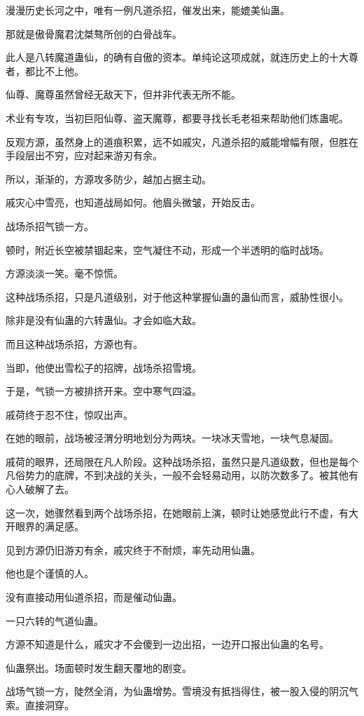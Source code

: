 \begin{this_body}
漫漫历史长河之中，唯有一例凡道杀招，催发出来，能媲美仙蛊。

那就是傲骨魔君沈桀骜所创的白骨战车。

此人是八转魔道蛊仙，的确有自傲的资本。单纯论这项成就，就连历史上的十大尊者，都比不上他。

仙尊、魔尊虽然曾经无敌天下，但并非代表无所不能。

术业有专攻，当初巨阳仙尊、盗天魔尊，都要寻找长毛老祖来帮助他们炼蛊呢。

反观方源，虽然身上的道痕积累，远不如戚灾，凡道杀招的威能增幅有限，但胜在手段层出不穷，应对起来游刃有余。

所以，渐渐的，方源攻多防少，越加占据主动。

戚灾心中雪亮，也知道战局如何。他眉头微皱，开始反击。

战场杀招气锁一方。

顿时，附近长空被禁锢起来，空气凝住不动，形成一个半透明的临时战场。

方源淡淡一笑。毫不惊慌。

这种战场杀招，只是凡道级别，对于他这种掌握仙蛊的蛊仙而言，威胁性很小。

除非是没有仙蛊的六转蛊仙。才会如临大敌。

而且这种战场杀招，方源也有。

当即，他使出雪松子的招牌，战场杀招雪境。

于是，气锁一方被排挤开来。空中寒气四溢。

戚荷终于忍不住，惊叹出声。

在她的眼前，战场被泾渭分明地划分为两块。一块冰天雪地，一块气息凝固。

戚荷的眼界，还局限在凡人阶段。这种战场杀招，虽然只是凡道级数，但也是每个凡俗势力的底牌，不到决战的关头，一般不会轻易动用，以防次数多了。被其他有心人破解了去。

这一次，她骤然看到两个战场杀招，在她眼前上演，顿时让她感觉此行不虚，有大开眼界的满足感。

见到方源仍旧游刃有余，戚灾终于不耐烦，率先动用仙蛊。

他也是个谨慎的人。

没有直接动用仙道杀招，而是催动仙蛊。

一只六转的气道仙蛊。

方源不知道是什么，戚灾才不会傻到一边出招，一边开口报出仙蛊的名号。

仙蛊祭出。场面顿时发生翻天覆地的剧变。

战场气锁一方，陡然全消，为仙蛊增势。雪境没有抵挡得住，被一股入侵的阴沉气索。直接洞穿。


\end{this_body}

